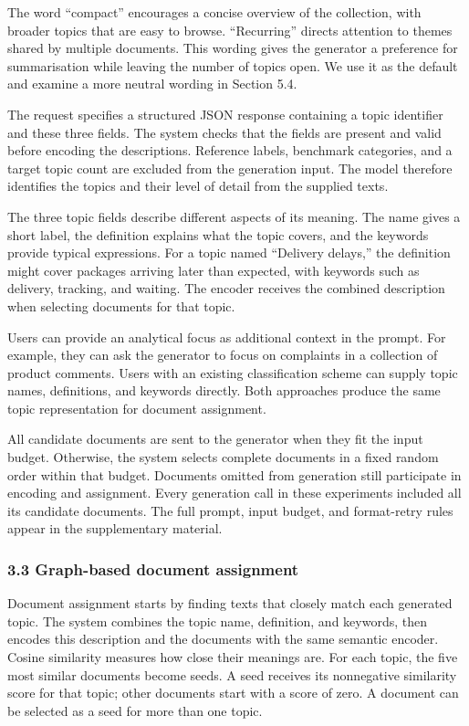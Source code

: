 \documentclass[
  11pt,
  a4paper,
]{article}
\begin{document}
The word ``compact'' encourages a concise overview of the collection,
with broader topics that are easy to browse. ``Recurring'' directs
attention to themes shared by multiple documents. This wording gives the
generator a preference for summarisation while leaving the number of
topics open. We use it as the default and examine a more neutral wording
in Section 5.4.

The request specifies a structured JSON response containing a topic
identifier and these three fields. The system checks that the fields are
present and valid before encoding the descriptions. Reference labels,
benchmark categories, and a target topic count are excluded from the
generation input. The model therefore identifies the topics and their
level of detail from the supplied texts.

The three topic fields describe different aspects of its meaning. The
name gives a short label, the definition explains what the topic covers,
and the keywords provide typical expressions. For a topic named
``Delivery delays,'' the definition might cover packages arriving later
than expected, with keywords such as delivery, tracking, and waiting.
The encoder receives the combined description when selecting documents
for that topic.

Users can provide an analytical focus as additional context in the
prompt. For example, they can ask the generator to focus on complaints
in a collection of product comments. Users with an existing
classification scheme can supply topic names, definitions, and keywords
directly. Both approaches produce the same topic representation for
document assignment.

All candidate documents are sent to the generator when they fit the
input budget. Otherwise, the system selects complete documents in a
fixed random order within that budget. Documents omitted from generation
still participate in encoding and assignment. Every generation call in
these experiments included all its candidate documents. The full prompt,
input budget, and format-retry rules appear in the supplementary
material.

\subsubsection{3.3 Graph-based document
assignment}\label{graph-based-document-assignment}

Document assignment starts by finding texts that closely match each
generated topic. The system combines the topic name, definition, and
keywords, then encodes this description and the documents with the same
semantic encoder. Cosine similarity measures how close their meanings
are. For each topic, the five most similar documents become seeds. A
seed receives its nonnegative similarity score for that topic; other
documents start with a score of zero. A document can be selected as a
seed for more than one topic.
\end{document}

